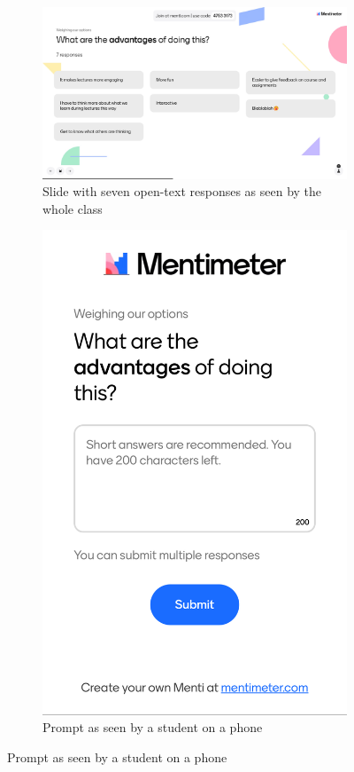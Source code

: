 \begin{figure}[h!]
\centering
\begin{subfigure}{0.65\textwidth}
    \includegraphics[width=\textwidth]{figures/Mentimeter-host.png}
    \caption{Slide with seven open-text responses as seen by the whole class}
    \label{fig:mentimeterhost}
\end{subfigure}
\hfill
\begin{subfigure}{0.3\textwidth}
    \includegraphics[width=\textwidth]{figures/Mentimeter-client.jpg}
    \caption{Prompt as seen by a student on a phone}
    \label{fig:mentimeterclient}
\end{subfigure}
        

\end{figure}

